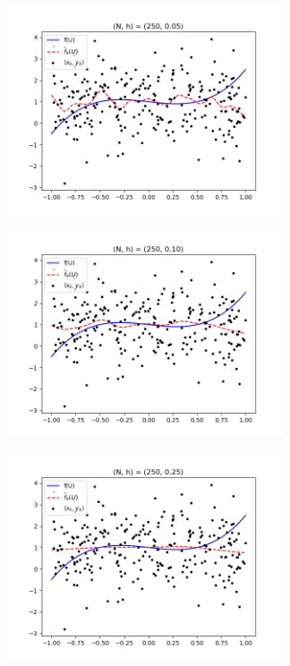 \begin{figure}[h!]
    \centering
    \begin{subfigure}[h]{0.5\textwidth}
        \centering
        \includegraphics[height=2.4in]{Figure_5.png}
    \end{subfigure}%
    \begin{subfigure}[h]{0.5\textwidth}
        \centering
        \includegraphics[height=2.4in]{Figure_6.png}
    \end{subfigure}
    \begin{subfigure}[h]{0.5\textwidth}
        \centering
        \includegraphics[height=2.4in]{Figure_7.png}
    \end{subfigure}%
    \begin{subfigure}[h]{0.5\textwidth}
        \centering

\end{subfigure}
\end{figure}
